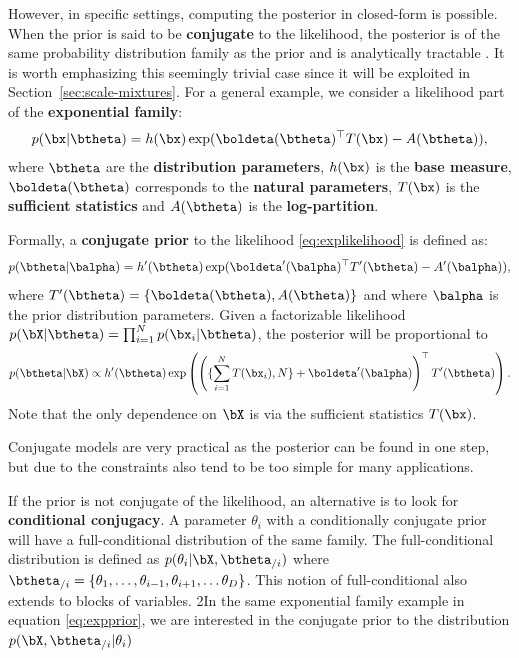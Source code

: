 However, in specific settings, computing the posterior in closed-form is possible.
When the prior is said to be \textbf{conjugate} to the likelihood, the posterior is of the same probability distribution family as the prior and is analytically tractable \cite{schlaifer1961applied}.
It is worth emphasizing this seemingly trivial case since it will be exploited in Section~\ref{sec:scale-mixtures}.
For a general example, we consider a likelihood part of the \textbf{exponential family}:
\begin{align}
    p(\bx|\btheta) = h(\bx)\exp(\boldeta(\btheta)^\top T(\bx) - A(\btheta)),
    \label{eq:explikelihood}
\end{align}
where $\btheta$ are the \textbf{distribution parameters}, $h(\bx)$ is the \textbf{base measure}, $\boldeta(\btheta)$ corresponds to the \textbf{natural parameters}, $T(\bx)$ is the \textbf{sufficient statistics} and $A(\btheta)$ is the \textbf{log-partition}.

Formally, a \textbf{conjugate prior} to the likelihood \eqref{eq:explikelihood} is defined as:
\begin{align}
    p(\btheta|\balpha) = h'(\btheta)\exp(\boldeta'(\balpha)^\top T'(\btheta) - A'(\balpha)),
    \label{eq:expprior}
\end{align}
where $T'(\btheta) = \left\{\boldeta(\btheta), A(\btheta)\right\}$ and where $\balpha$ is the prior distribution parameters.
Given a factorizable likelihood $p(\bX|\btheta) = \prod_{i=1}^N p(\bx_i|\btheta)$, the posterior will be proportional to
\begin{align}
    p(\btheta|\bX) \propto h'(\btheta)\exp\left(\left(\{\sum_{i=1}^N T(\bx_i), N\} + \boldeta'(\balpha)\right)^\top T'(\btheta)\right).\label{eq:posterior}
\end{align}
Note that the only dependence on $\bX$ is via the sufficient statistics $T(\bx)$.

Conjugate models are very practical as the posterior can be found in one step, but due to the constraints also tend to be too simple for many applications.

If the prior is not conjugate of the likelihood, an alternative is to look for \textbf{conditional conjugacy}.
A parameter $\theta_i$ with a conditionally conjugate prior will have a full-conditional distribution of the same family.
The full-conditional distribution is defined as $p(\theta_i|
\bX, \btheta_{/i})$ where $\btheta_{/i} = \{\theta_1, \ldots, \theta_{i-1},\theta_{i+1},\ldots\theta_D\}$.
This notion of full-conditional also extends to blocks of variables.
2In the same exponential family example in equation \eqref{eq:expprior}, we are interested in the conjugate prior to the distribution $p(\bX, \btheta_{/i} | \theta_i)$


